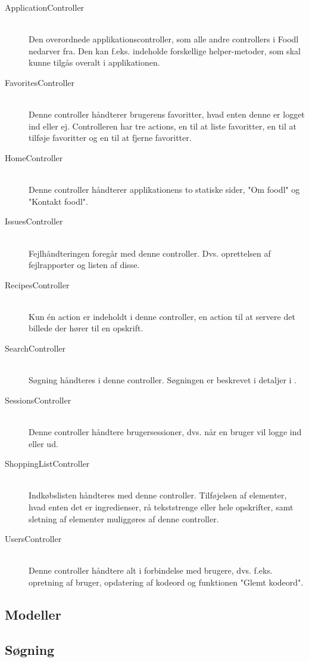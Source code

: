\begin{description}
\item[ApplicationController] \hfill \\ 
Den overordnede applikationscontroller, som alle andre controllers i Foodl nedarver fra. Den kan f.eks. indeholde forskellige helper-metoder, som skal kunne tilgås overalt i applikationen.

\item[FavoritesController] \hfill \\ 
Denne controller håndterer brugerens favoritter, hvad enten denne er logget ind eller ej. Controlleren har tre actions, en til at liste favoritter, en til at tilføje favoritter og en til at fjerne favoritter.

\item[HomeController] \hfill \\ 
Denne controller håndterer applikationens to statiske sider, "Om foodl" og "Kontakt foodl".

\item[IssuesController] \hfill \\ 
Fejlhåndteringen foregår med denne controller. Dvs. oprettelsen af fejlrapporter og listen af disse.

\item[RecipesController] \hfill \\
Kun én action er indeholdt i denne controller, en action til at servere det billede der hører til en opskrift.

\item[SearchController] \hfill \\
Søgning håndteres i denne controller. Søgningen er beskrevet i detaljer i .

\item[SessionsController] \hfill \\
Denne controller håndtere brugersessioner, dvs. når en bruger vil logge ind eller ud.

\item[ShoppingListController] \hfill \\
Indkøbslisten håndteres med denne controller. Tilføjelsen af elementer, hvad enten det er ingredienser, rå tekststrenge eller hele opskrifter, samt sletning af elementer muliggøres af denne controller.

\item[UsersController] \hfill \\
Denne controller håndtere alt i forbindelse med brugere, dvs. f.eks. opretning af bruger, opdatering af kodeord og funktionen "Glemt kodeord".

\end{description}

\subsection{Modeller}


\subsection{Søgning}
\label{sec:soegning}



